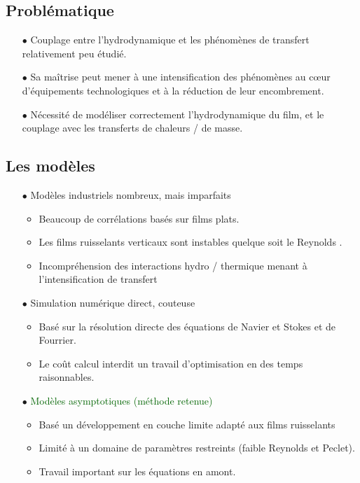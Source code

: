 \documentclass[a0,portrait]{a0poster}
\begin{document}
\begin{multicols}{2}
    \color{DarkSlateGray} %

    \section*{Problématique}
    \begin{itemize}
    	\item[$\bullet$] Couplage entre l'hydrodynamique et les phénomènes de transfert relativement peu étudié.
    	\item[$\bullet$] Sa maîtrise peut mener à une intensification des phénomènes au cœur d'équipements technologiques et à la réduction de leur encombrement.
    	\item[$\bullet$] Nécessité de modéliser correctement l'hydrodynamique du film, et le couplage avec les transferts de chaleurs / de masse.
    \end{itemize}

    \subsection*{Les modèles}
    \begin{itemize}
	    \item[$\bullet$] Modèles industriels nombreux, mais imparfaits \cite{Killion2001}
    	\begin{itemize}
    		\item Beaucoup de corrélations basés sur films plats.
    		\color{DarkRed} \item Les films ruisselants verticaux sont instables quelque soit le Reynolds \textcite{Miller1998a}.
    		\item Incompréhension des interactions hydro / thermique menant à l'intensification de transfert
    	\end{itemize}
	    \item[$\bullet$] Simulation numérique direct, couteuse
    	\begin{itemize}
    		\item Basé sur la résolution directe des équations de Navier et Stokes et de Fourrier.
    		\color{DarkRed} \item Le coût calcul interdit un travail d'optimisation en des temps raisonnables.
    	\end{itemize}
	    \item[$\bullet$] \textcolor{DarkGreen}{Modèles asymptotiques (méthode retenue)}
    	\begin{itemize}
    		\item Basé un développement en couche limite adapté aux films ruisselants
    		\color{DarkRed} \item Limité à un domaine de paramètres restreints (faible Reynolds et Peclet).
    		\color{DarkRed} \item Travail important sur les équations en amont.
    	\end{itemize}
    \end{itemize}
\end{multicols}
\end{document}
